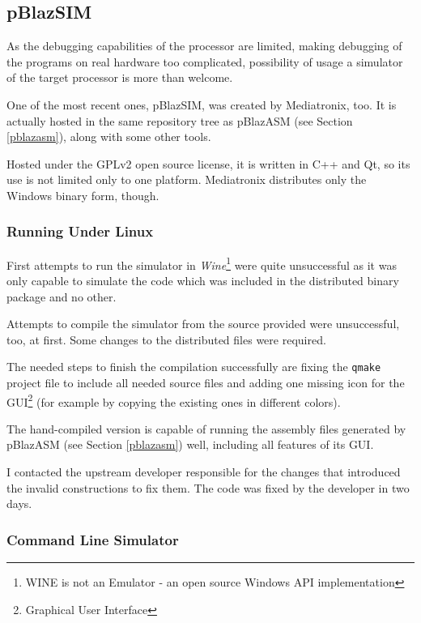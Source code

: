         \subsection{pBlazSIM}\label{pblazsim}

        As the debugging capabilities of the processor are limited, making debugging of the programs on real hardware too complicated, possibility of usage a simulator of the target processor is more than welcome.

        One of the most recent ones, pBlazSIM, was created by Mediatronix, too. It is actually hosted in the same repository tree as pBlazASM (see Section \ref{pblazasm}), along with some other tools.\cite{PblazSim} \cite{PblazAsmRepo}

        Hosted under the GPLv2 open source license, it is written in C++ and Qt, so its use is not limited only to one platform. Mediatronix distributes only the Windows binary form, though.

            \subsubsection{Running Under Linux}

            First attempts to run the simulator in \emph{Wine}\footnote{WINE is not an Emulator - an open source Windows API implementation} were quite unsuccessful as it was only capable to simulate the code which was included in the distributed binary package and no other.

            Attempts to compile the simulator from the source provided were unsuccessful, too, at first. Some changes to the distributed files were required.

            The needed steps to finish the compilation successfully are fixing the \texttt{qmake} project file to include all needed source files and adding one missing icon for the GUI\footnote{Graphical User Interface} (for example by copying the existing ones in different colors).

            The hand-compiled version is capable of running the assembly files generated by pBlazASM (see Section \ref{pblazasm}) well, including all features of its GUI.

            I contacted the upstream developer responsible for the changes that introduced the invalid constructions to fix them. The code was fixed by the developer in two days.

            \subsubsection{Command Line Simulator}

